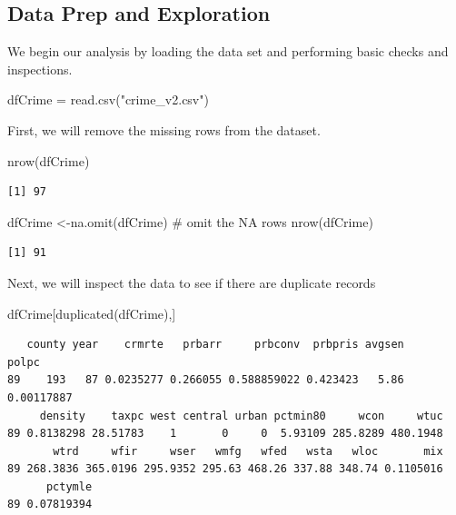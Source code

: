 \documentclass[]{article}
\newenvironment{Shaded}{}{}
\newcommand{\CommentTok}[1]{\textcolor[rgb]{0.00,0.50,0.00}{#1}}
\newcommand{\KeywordTok}[1]{\textcolor[rgb]{0.00,0.00,1.00}{#1}}
\newcommand{\NormalTok}[1]{#1}
\newcommand{\StringTok}[1]{\textcolor[rgb]{0.00,0.50,0.50}{#1}}
\begin{document}
\hypertarget{data-prep-and-exploration}{%
\subsection{Data Prep and Exploration}\label{data-prep-and-exploration}}

We begin our analysis by loading the data set and performing basic
checks and inspections.

\begin{Shaded}
\begin{Highlighting}[]
\NormalTok{dfCrime =}\StringTok{ }\KeywordTok{read.csv}\NormalTok{(}\StringTok{"crime_v2.csv"}\NormalTok{)}
\end{Highlighting}
\end{Shaded}

First, we will remove the missing rows from the dataset.

\begin{Shaded}
\begin{Highlighting}[]
\KeywordTok{nrow}\NormalTok{(dfCrime)}
\end{Highlighting}
\end{Shaded}

\begin{verbatim}
[1] 97
\end{verbatim}

\begin{Shaded}
\begin{Highlighting}[]
\NormalTok{dfCrime <-}\KeywordTok{na.omit}\NormalTok{(dfCrime) }\CommentTok{# omit the NA rows}
\KeywordTok{nrow}\NormalTok{(dfCrime)}
\end{Highlighting}
\end{Shaded}

\begin{verbatim}
[1] 91
\end{verbatim}

Next, we will inspect the data to see if there are duplicate records

\begin{Shaded}
\begin{Highlighting}[]
\NormalTok{dfCrime[}\KeywordTok{duplicated}\NormalTok{(dfCrime),]}
\end{Highlighting}
\end{Shaded}

\begin{verbatim}
   county year    crmrte   prbarr     prbconv  prbpris avgsen      polpc
89    193   87 0.0235277 0.266055 0.588859022 0.423423   5.86 0.00117887
     density    taxpc west central urban pctmin80     wcon     wtuc
89 0.8138298 28.51783    1       0     0  5.93109 285.8289 480.1948
       wtrd     wfir     wser   wmfg   wfed   wsta   wloc       mix
89 268.3836 365.0196 295.9352 295.63 468.26 337.88 348.74 0.1105016
      pctymle
89 0.07819394
\end{verbatim}
\end{document}
